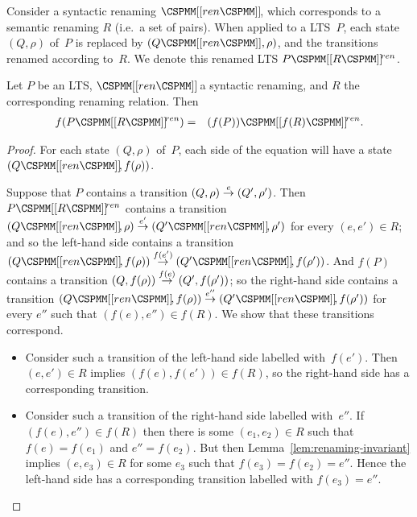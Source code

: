 


Consider a syntactic renaming $\rename{ren}$, which corresponds to a
semantic renaming $R$ (i.e.~a set of pairs).  When applied to a LTS~$P$, each
state $(Q,\rho)$ of~$P$ is replaced by $(Q\M{[[}ren\M{]]}, \rho)$, and the
transitions renamed according to~$R$.  We denote this renamed LTS
$P\rename{R}^{ren}$.
%
\begin{lemma}
\label{lem:renaming-f}
Let $P$ be an LTS, $\rename{ren}$ a syntactic renaming, and $R$ the
corresponding renaming relation.  Then
%
\begin{eqnarray*}
f(P\rename{R}^{ren}) & = & (f(P))\rename{f(R)}^{ren}.
\end{eqnarray*}
%
\end{lemma}


\begin{proof}
For each state $(Q,\rho)$ of~$P$, each side of the equation will have a
state $(Q\rename{ren}, f(\rho))$.


Suppose that $P$ contains a transition $(Q,\rho) \stackrel{e}{\rightarrow} (Q',\rho')$.  Then
$P\rename{R}^{ren}$ contains a transition $(Q\rename{ren},\rho) \trans{e'}
(Q'\rename{ren},\rho')$ for every $(e,e') \in R$; and so the left-hand side
contains a transition $(Q\rename{ren}, f(\rho)) \trans{f(e')}
(Q'\rename{ren}, {f(\rho')})$.  And $f(P)$ contains a transition $(Q,
f(\rho)) \stackrel{f(e)}{\rightarrow} (Q', f(\rho'))$; so the right-hand side contains
a transition $(Q\rename{ren}, f(\rho)) \trans{e''} (Q'\rename{ren},
{f(\rho')})$ for every $e''$ such that $(f(e), e'') \in f(R)$.  We show
that these transitions correspond.
%
\begin{itemize}
\item Consider such a transition of the left-hand side labelled with~$f(e')$.
Then $(e,e') \in R$ implies $(f(e),f(e')) \in f(R)$, so the right-hand side
  has a corresponding transition.

\item Consider such a transition of the right-hand side labelled with~$e''$.
  If $(f(e), e'') \in f(R)$ then there is some $(e_1,e_2) \in R$ such that
  $f(e) = f(e_1)$ and $e'' = f(e_2)$.  But then
  Lemma~\ref{lem:renaming-invariant} implies $(e,e_3) \in R$ for some $e_3$
  such that $f(e_3) = f(e_2) = e''$.  Hence the left-hand side has a
  corresponding transition labelled with $f(e_3) = e''$.
\end{itemize}
\end{proof}

